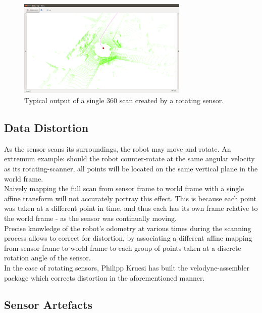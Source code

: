 \begin{figure}
  \centering
  \includegraphics[width=3.2in]{images/1_velodyne_scan.png}
  \caption{Typical output of a single 360 \degree scan created by a rotating sensor.}
  \label{fig:velodyne-scan}
\end{figure}


\subsection{Data Distortion}
\label{subsec:distortion}

As the sensor scans its surroundings, the robot may move and rotate. An extremum example: should the robot counter-rotate at the same angular velocity as its rotating-scanner, all points will be located on the same vertical plane in the world frame.\\

Naively mapping the full scan from sensor frame to world frame with a single affine transform will not accurately portray this effect. This is because each point was taken at a different point in time, and thus each has its own frame relative to the world frame - as the sensor was continually moving.\\

Precise knowledge of the robot’s odometry at various times during the scanning process allows to correct for distortion, by associating a different affine mapping from sensor frame to world frame to each group of points taken at a discrete rotation angle of the sensor.\\

In the case of rotating sensors, Philipp Kruesi has built the velodyne-assembler package which corrects distortion in the aforementioned manner.\\ %

\subsection{Sensor Artefacts}
\label{subsec:artefacts}


